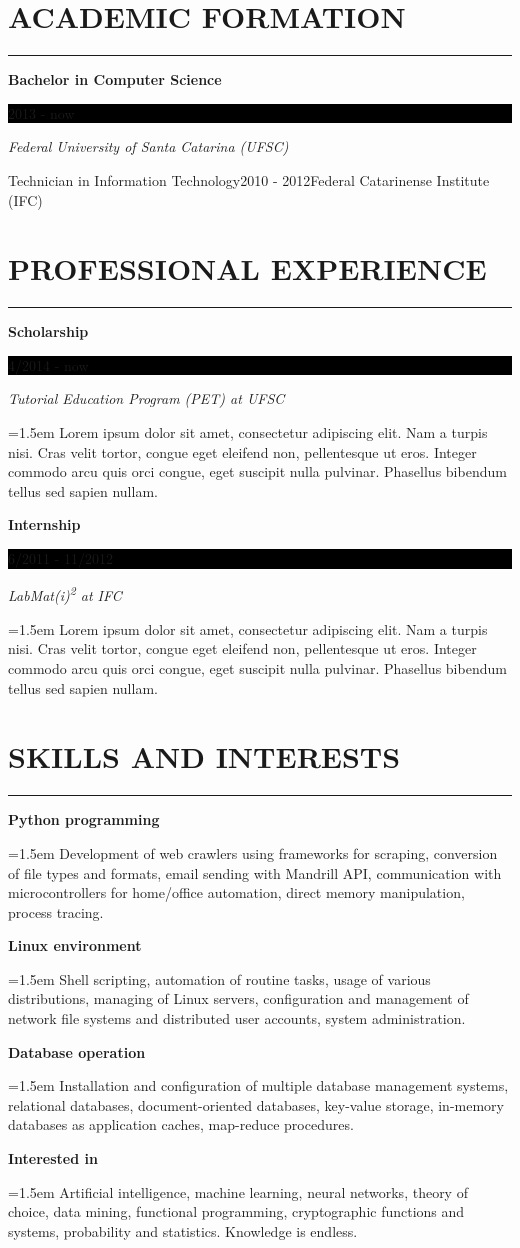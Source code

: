 \documentclass{article}
\newcommand{\formationentry}[4]{%
	\noindent \textbf{#1} \hfill
	\colorbox{black}{%
		\parbox[c][1em]{8em}{%
			\hfill \color{white} #2
		}
	} \par
	\noindent \textit{#3} \par
	\normalsize
	\vspace{1em}
}
\newcommand{\experienceentry}[4]{%
	\noindent \textbf{#1} \hfill
	\colorbox{black}{%
		\parbox[c][1em]{8em}{%
			\hfill \color{white} #2
		}
	} \par
	\noindent \textit{#3} \par
	\noindent \hangindent=1.5em \hangafter=0 \small #4 \par
	\normalsize
	\vspace{1em}
}
\newcommand{\skillentry}[2]{%
	\noindent \textbf{#1} \hfill \par
	\noindent \hangindent=1.5em \hangafter=0 \small #2 \par
	\normalsize
	\vspace{1em}
}
\newenvironment{main}{%
\noindent
\begin{minipage}[t]{\dimexpr0.75\textwidth-2em}%
\let\oldsection\section
\renewcommand{\section}[1]{\oldsection*{\uppercase{##1}}\vspace{-0.5em}\hrule\vspace{1em}}
}{%
\let\section\oldsection
\end{minipage}%
}
\begin{document}
\begin{main}%
\section{Academic Formation}
\formationentry{Bachelor in Computer Science}{2013 - now}{Federal University
of Santa Catarina (UFSC)}

\formationentry{Technician in Information Technology}{2010 - 2012}{Federal
Catarinense Institute (IFC)}


\section{Professional Experience}
\experienceentry{Scholarship}{4/2014 - now}{Tutorial Education Program (PET) at
UFSC}{Lorem ipsum dolor sit amet, consectetur adipiscing elit. Nam a turpis
nisi. Cras velit tortor, congue eget eleifend non, pellentesque ut eros.
Integer commodo arcu quis orci congue, eget suscipit nulla pulvinar.
Phasellus bibendum tellus sed sapien nullam.}

\experienceentry{Internship}{6/2011 - 11/2012}{LabMat(i)\textsuperscript{2} at
IFC}{Lorem ipsum dolor sit amet, consectetur adipiscing elit. Nam a turpis
nisi. Cras velit tortor, congue eget eleifend non, pellentesque ut eros.
Integer commodo arcu quis orci congue, eget suscipit nulla pulvinar.
Phasellus bibendum tellus sed sapien nullam.}


\section{Skills and Interests}
\skillentry{Python programming}{Development of web crawlers using frameworks
for scraping, conversion of file types and formats, email sending with
Mandrill API, communication with microcontrollers for home/office automation,
direct memory manipulation, process tracing.}

\skillentry{Linux environment}{Shell scripting, automation of routine tasks, usage of various distributions, managing of Linux servers, configuration and management of network file systems and distributed user accounts, system administration.}

\skillentry{Database operation}{Installation and configuration of multiple database management systems, relational databases, document-oriented databases, key-value storage, in-memory databases as application caches, map-reduce procedures.}

\skillentry{Interested in}{Artificial intelligence, machine learning, neural networks, theory of choice, data mining, functional programming, cryptographic functions and systems, probability and statistics. Knowledge is endless.}



\end{main}
\end{document}
